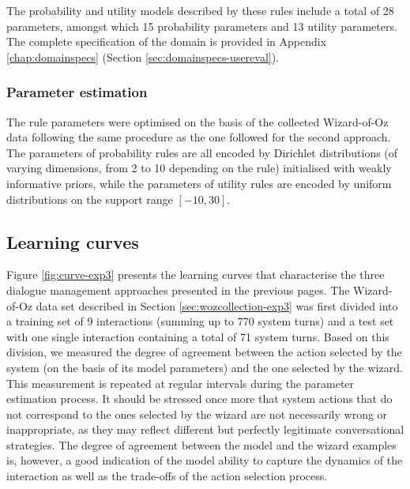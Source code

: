 \begin{itemize}
\end{itemize}

The probability and utility models described by these rules include a total of 28 parameters, amongst which 15 probability parameters and 13 utility parameters.  The complete specification of the domain is provided in Appendix \ref{chap:domainspecs} (Section \ref{sec:domainspecs-usereval}). 

\subsubsection*{Parameter estimation}

The rule parameters were optimised on the basis of the collected Wizard-of-Oz data following the same procedure as the one followed for the second approach.  The parameters of probability rules are all encoded by Dirichlet distributions (of varying dimensions, from 2 to 10 depending on the rule) initialised with weakly informative priors, while the parameters of utility rules are encoded by uniform distributions on the support range $[-10, 30]$.  


\subsection{Learning curves}
\label{sec:learningcurve-exp3}

Figure \ref{fig:curve-exp3} presents the learning curves that characterise the three dialogue management approaches presented in the previous pages. The Wizard-of-Oz data set described in Section \ref{sec:wozcollection-exp3} was first divided into a training set of 9 interactions (summing up to 770 system turns) and a test set with one single interaction containing a total of 71 system turns. Based on this division, we measured the degree of agreement between the action selected by the system (on the basis of its model parameters) and the one selected by the wizard. This measurement is repeated at regular intervals during the parameter estimation process.  It should be stressed once more that system actions that do not correspond to the ones selected by the wizard are not necessarily wrong or inappropriate, as they may reflect different but perfectly legitimate conversational strategies. The degree of agreement between the model and the wizard examples is, however, a good indication of the model ability to capture the dynamics of the interaction as well as the trade-offs of the action selection process. 

